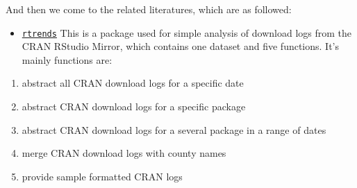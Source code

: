 \documentclass[
]{book}
\providecommand{\tightlist}{%
  \setlength{\itemsep}{0pt}\setlength{\parskip}{0pt}}
\begin{document}
And then we come to the related literatures, which are as followed:

\begin{itemize}
\tightlist
\item
  \href{https://cran.r-project.org/web/packages/rtrends/rtrends.pdf}{\texttt{rtrends}}
  This is a package used for simple analysis of download logs from the CRAN RStudio Mirror, which contains one dataset and five functions. It's mainly functions are:
\end{itemize}

\begin{enumerate}
\def\labelenumi{(\arabic{enumi})}
\tightlist
\item
  abstract all CRAN download logs for a specific date
\item
  abstract CRAN download logs for a specific package
\item
  abstract CRAN download logs for a several package in a range of dates
\item
  merge CRAN download logs with county names
\item
  provide sample formatted CRAN logs
\end{enumerate}
\end{document}
